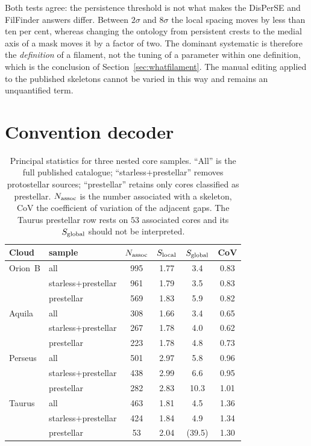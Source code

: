\documentclass[usenatbib,twoside,twocolumn]{mnras}
\begin{document}
\smallskip\noindent Both tests agree: the persistence threshold is not what makes the DisPerSE and FilFinder answers differ. Between $2\sigma$ and $8\sigma$ the local spacing moves by less than ten per cent, whereas changing the ontology from persistent crests to the medial axis of a mask moves it by a factor of two. The dominant systematic is therefore the \emph{definition} of a filament, not the tuning of a parameter within one definition, which is the conclusion of Section~\ref{sec:whatfilament}. The manual editing applied to the published skeletons cannot be varied in this way and remains an unquantified term.


\section{Convention decoder}

\begin{table}
\caption{Principal statistics for three nested core samples. ``All'' is the full published catalogue; ``starless$+$prestellar'' removes protostellar sources; ``prestellar'' retains only cores classified as prestellar. $N_{\rm assoc}$ is the number associated with a skeleton, CoV the coefficient of variation of the adjacent gaps. The Taurus prestellar row rests on $53$ associated cores and its $S_{\rm global}$ should not be interpreted.}
\label{tab:popsplit}
\footnotesize
\setlength{\tabcolsep}{4pt}
\begin{tabular}{llcccc}
\toprule
Cloud & sample & $N_{\rm assoc}$ & $S_{\rm local}$ & $S_{\rm global}$ & CoV \\
\midrule
Orion~B & all                  & 995 & 1.77 & 3.4 & 0.83 \\
        & starless$+$prestellar& 961 & 1.79 & 3.5 & 0.83 \\
        & prestellar           & 569 & 1.83 & 5.9 & 0.82 \\
\midrule
Aquila  & all                  & 308 & 1.66 & 3.4 & 0.65 \\
        & starless$+$prestellar& 267 & 1.78 & 4.0 & 0.62 \\
        & prestellar           & 223 & 1.78 & 4.8 & 0.73 \\
\midrule
Perseus & all                  & 501 & 2.97 & 5.8 & 0.96 \\
        & starless$+$prestellar& 438 & 2.99 & 6.6 & 0.95 \\
        & prestellar           & 282 & 2.83 & 10.3 & 1.01 \\
\midrule
Taurus  & all                  & 463 & 1.81 & 4.5 & 1.36 \\
        & starless$+$prestellar& 424 & 1.84 & 4.9 & 1.34 \\
        & prestellar           &  53 & 2.04 & (39.5) & 1.30 \\
\bottomrule
\end{tabular}
\end{table}
\end{document}
